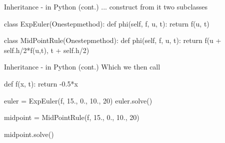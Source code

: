 \documentclass[hyperref={pdfpagelabels=false},table]{beamer}
\begin{document}
\begin{frame}[fragile]{Inheritance - in Python \hfill (cont.)}
 ... construct from it two subclasses
 \begin{python}
class ExpEuler(Onestepmethod):
    def phi(self, f, u, t):
        return f(u, t)

class MidPointRule(Onestepmethod):
    def phi(self, f, u, t):
        return f(u + self.h/2*f(u,t), t + self.h/2)
\end{python}

\end{frame}
\begin{frame}[fragile]{Inheritance - in Python \hfill (cont.)}
Which we then call
\begin{python}
def f(x, t):
    return -0.5*x

euler = ExpEuler(f, 15., 0., 10., 20)
euler.solve()

midpoint = MidPointRule(f, 15., 0., 10., 20)

midpoint.solve()
\end{python}
\end{frame}
\end{document}
